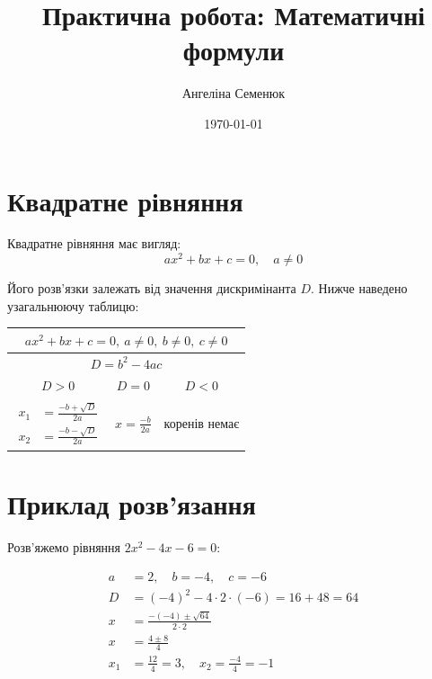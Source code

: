 \documentclass[12pt]{article}
\title{Практична робота: Математичні формули}
\author{Ангеліна Семенюк}
\date{\today}
\begin{document}
\maketitle

\section*{Квадратне рівняння}

Квадратне рівняння має вигляд:
\begin{equation}
ax^2 + bx + c = 0, \quad a \neq 0
\end{equation}

Його розв'язки залежать від значення дискримінанта $D$. Нижче наведено узагальнюючу таблицю:


\begin{table}[h]
\centering
\renewcommand{\arraystretch}{2}

\begin{tabular}{|c|c|c|}
\hline
\multicolumn{3}{|c|}{$ax^2 + bx + c = 0,\ a \neq 0,\ b \neq 0,\ c \neq 0$} \\ \hline
\multicolumn{3}{|c|}{$D = b^2 - 4ac$} \\ \hline
$D > 0$ & $D = 0$ & $D < 0$ \\ \hline

$\begin{aligned}
x_1 &= \frac{-b + \sqrt{D}}{2a} \\
x_2 &= \frac{-b - \sqrt{D}}{2a}
\end{aligned}$

&

$x = \frac{-b}{2a}$

&

коренів немає \\ \hline

\end{tabular}
\end{table}


\section*{Приклад розв'язання}

Розв'яжемо рівняння $2x^2 - 4x - 6 = 0$:

\begin{align*}
a &= 2, \quad b = -4, \quad c = -6 \\
D &= (-4)^2 - 4 \cdot 2 \cdot (-6) = 16 + 48 = 64 \\
x &= \frac{-(-4) \pm \sqrt{64}}{2 \cdot 2} \\
x &= \frac{4 \pm 8}{4} \\
x_1 &= \frac{12}{4} = 3, \quad x_2 = \frac{-4}{4} = -1
\end{align*}
\end{document}
